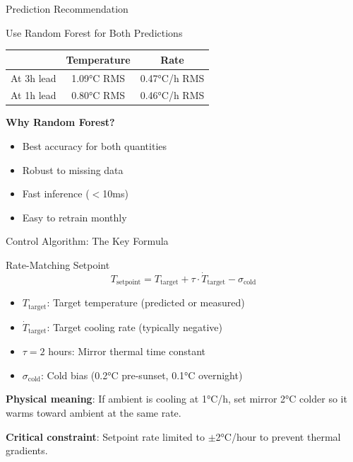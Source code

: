 \documentclass[aspectratio=169,11pt]{beamer}
\begin{document}
\begin{frame}{Prediction Recommendation}

\begin{block}{Use Random Forest for Both Predictions}
\centering
\begin{tabular}{l|cc}
\toprule
& \textbf{Temperature} & \textbf{Rate} \\
\midrule
At 3h lead & 1.09°C RMS & 0.47°C/h RMS \\
At 1h lead & 0.80°C RMS & 0.46°C/h RMS \\
\bottomrule
\end{tabular}
\end{block}

\vspace{1em}

\textbf{Why Random Forest?}
\begin{itemize}
    \item Best accuracy for both quantities
    \item Robust to missing data
    \item Fast inference ($<$10ms)
    \item Easy to retrain monthly
\end{itemize}

\end{frame}

\begin{frame}{Control Algorithm: The Key Formula}

\begin{block}{Rate-Matching Setpoint}
\Large
\[
\boxed{T_\text{setpoint} = T_\text{target} + \tau \cdot \dot{T}_\text{target} - \sigma_\text{cold}}
\]
\end{block}

\normalsize
\vspace{0.5em}

\begin{itemize}
    \item $T_\text{target}$: Target temperature (predicted or measured)
    \item $\dot{T}_\text{target}$: Target cooling rate (typically negative)
    \item $\tau = 2$ hours: Mirror thermal time constant
    \item $\sigma_\text{cold}$: Cold bias (0.2°C pre-sunset, 0.1°C overnight)
\end{itemize}

\vspace{0.5em}

\textbf{Physical meaning}: If ambient is cooling at 1°C/h, set mirror 2°C colder so it warms toward ambient at the same rate.

\vspace{0.5em}

\textbf{Critical constraint}: Setpoint rate limited to $\pm$2°C/hour to prevent thermal gradients.

\end{frame}
\end{document}
